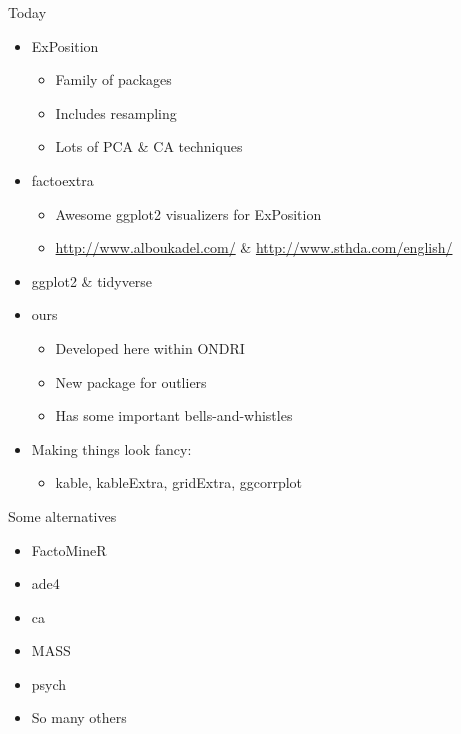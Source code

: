 \documentclass[
  ignorenonframetext,
]{beamer}
\providecommand{\tightlist}{%
  \setlength{\itemsep}{0pt}\setlength{\parskip}{0pt}}
\begin{document}
\begin{frame}{Today}
\protect\hypertarget{today}{}

\begin{itemize}[<+->]
\tightlist
\item
  ExPosition

  \begin{itemize}[<+->]
  \tightlist
  \item
    Family of packages
  \item
    Includes resampling
  \item
    Lots of PCA \& CA techniques
  \end{itemize}
\item
  factoextra

  \begin{itemize}[<+->]
  \tightlist
  \item
    Awesome ggplot2 visualizers for ExPosition
  \item
    \url{http://www.alboukadel.com/} \&
    \url{http://www.sthda.com/english/}
  \end{itemize}
\item
  ggplot2 \& tidyverse
\item
  ours

  \begin{itemize}[<+->]
  \tightlist
  \item
    Developed here within ONDRI
  \item
    New package for outliers
  \item
    Has some important bells-and-whistles
  \end{itemize}
\item
  Making things look fancy:

  \begin{itemize}[<+->]
  \tightlist
  \item
    kable, kableExtra, gridExtra, ggcorrplot
  \end{itemize}
\end{itemize}

\end{frame}

\begin{frame}{Some alternatives}
\protect\hypertarget{some-alternatives}{}

\begin{itemize}[<+->]
\tightlist
\item
  FactoMineR
\item
  ade4
\item
  ca
\item
  MASS
\item
  psych
\item
  So many others
\end{itemize}

\end{frame}
\end{document}

